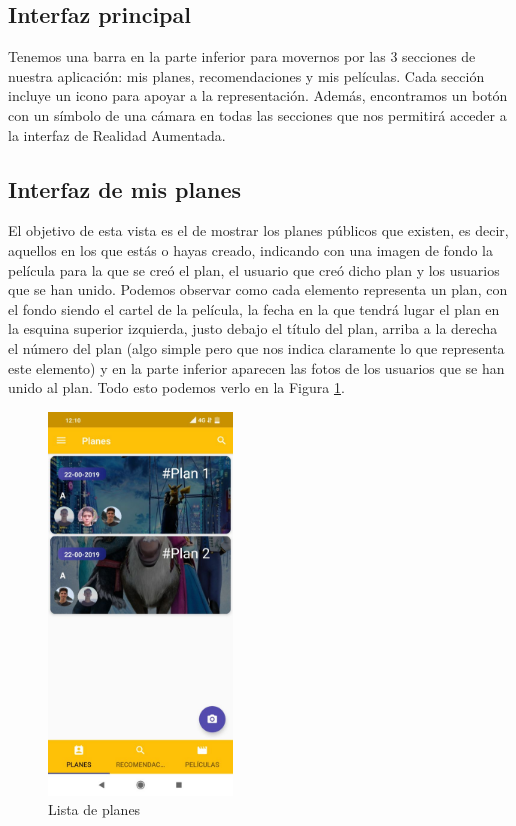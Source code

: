 \subsection{Interfaz principal}
\label{makereference3.4.1}
Tenemos una barra en la parte inferior para movernos por las 3 secciones de nuestra aplicación: mis planes, recomendaciones y mis películas.
Cada sección incluye un icono para apoyar a la representación.
Además, encontramos un botón con un símbolo de una cámara en todas las secciones que nos permitirá acceder a la interfaz de Realidad Aumentada.
\subsection{Interfaz de mis planes}
\label{makereference3.4.2}
El objetivo de esta vista es el de mostrar los planes públicos que existen, es decir, aquellos en los que estás o hayas creado, indicando con una imagen de fondo la película para la que se creó el plan, el usuario
que creó dicho plan y los usuarios que se han unido. 
Podemos observar como cada elemento representa un plan, con el fondo siendo el cartel de la película, la fecha en la que tendrá lugar el plan en la esquina superior izquierda,
justo debajo el título del plan, arriba a la derecha el número del plan (algo simple pero que nos indica
claramente lo que representa este elemento) y en la parte inferior aparecen las fotos de los usuarios que se han unido al plan.
Todo esto podemos verlo en la Figura \ref{fig:listaPlanes}.
\begin{figure}[H]
    \centering
    \includegraphics[height=4in]{figures/chapter-3/plan-list.jpg}
    \caption{Lista de planes}
    \label{fig:listaPlanes}
\end{figure}

